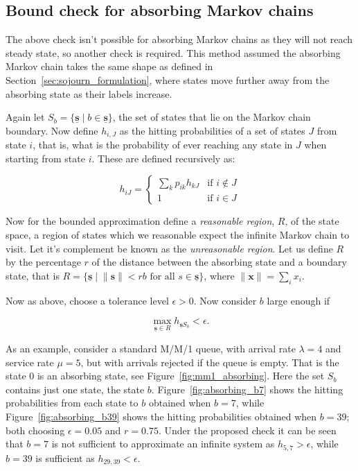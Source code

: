 \documentclass{article}
\begin{document}



\subsection{Bound check for absorbing Markov chains}\label{sec:absorbing_check}
The above check isn't possible for absorbing Markov chains as they will not
reach steady state, so another check is required. This method assumed the
absorbing Markov chain takes the same shape as defined in
Section~\ref{sec:sojourn_formulation}, where states move further away from the
absorbing state as their labels increase.

Again let $S_b = \{\underline{\mathbf{s}} \;|\; b \in \underline{\mathbf{s}}\}$,
the set of states that lie on the Markov chain boundary. Now define $h_{i,J}$ as
the hitting probabilities of a set of states $J$ from state $i$, that is, what
is the probability of ever reaching any state in $J$ when starting from state
$i$. These are defined recursively as:

\begin{equation}
h_{iJ} = \begin{cases}
\sum_k p_{ik} h_{kJ} & \text{if } i \notin J \\
1 & \text{if } i \in J
\end{cases}
\end{equation}

Now for the bounded approximation define a \textit{reasonable region}, $R$, of
the state space, a region of states which we reasonable expect the infinite
Markov chain to visit. Let it's complement be known as the \textit{unreasonable
region}.
Let us define $R$ by the percentage $r$ of the distance between the absorbing
state and a boundary state, that is
$R = \{\underline{\mathbf{s}} \;|\; \lVert \mathbf{s} \rVert < rb \text{ for all } s \in \underline{\mathbf{s}}\}$,
where $\lVert \mathbf{x} \rVert = \sum_i x_i$.

Now as above, choose a tolerance level $\epsilon > 0$. Now consider $b$ large
enough if

\begin{equation}
\max_{\underline{\mathbf{s}} \in R} h_{\underline{\mathbf{s}} S_b} < \epsilon.
\end{equation}

As an example, consider a standard M/M/1 queue, with arrival rate $\lambda = 4$
and service rate $\mu = 5$, but with arrivals rejected if the queue is empty.
That is the state $0$ is an absorbing state, see Figure~\ref{fig:mm1_absorbing}.
Here the set $S_b$ contains just one state, the state $b$.
Figure~\ref{fig:absorbing_b7} shows the hitting probabilities from each state to
$b$ obtained when $b=7$, while Figure~\ref{fig:absorbing_b39} shows the hitting
probabilities obtained when $b=39$; both choosing $\epsilon=0.05$ and $r=0.75$.
Under the proposed check it can be seen that $b=7$ is not sufficient to
approximate an infinite system as $h_{5,7} > \epsilon$, while $b=39$ is
sufficient as $h_{29, 39} < \epsilon$.
\end{document}
